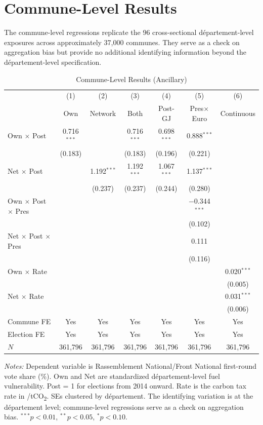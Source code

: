\documentclass[12pt]{article}
\providecommand{\euro}{\texteuro}
\newcommand{\rn}{Rassemblement National}
\newcommand{\fn}{Front National}
\newcommand{\dept}{d\'{e}partement}
\begin{document}
\section{Commune-Level Results}
\label{app:commune}

The commune-level regressions replicate the 96 cross-sectional \dept{}-level exposures across approximately 37,000 communes. They serve as a check on aggregation bias but provide no additional identifying information beyond the \dept{}-level specification.

\begin{table}[H]
\centering
\caption{Commune-Level Results (Ancillary)}
\label{tab:main}
\begin{threeparttable}
\begin{tabular}{@{}lcccccc@{}}
\toprule
 & (1) & (2) & (3) & (4) & (5) & (6) \\
 & Own & Network & Both & Post-GJ & Pres$\times$Euro & Continuous \\
\midrule
Own $\times$ Post & 0.716$^{***}$ & & 0.716$^{***}$ & 0.698$^{***}$ & 0.888$^{***}$ & \\
 & (0.183) & & (0.183) & (0.196) & (0.221) & \\[3pt]
Net $\times$ Post & & 1.192$^{***}$ & 1.192$^{***}$ & 1.067$^{***}$ & 1.137$^{***}$ & \\
 & & (0.237) & (0.237) & (0.244) & (0.280) & \\[3pt]
Own $\times$ Post $\times$ Pres & & & & & $-$0.344$^{***}$ & \\
 & & & & & (0.102) & \\[3pt]
Net $\times$ Post $\times$ Pres & & & & & 0.111 & \\
 & & & & & (0.116) & \\[3pt]
Own $\times$ Rate & & & & & & 0.020$^{***}$ \\
 & & & & & & (0.005) \\[3pt]
Net $\times$ Rate & & & & & & 0.031$^{***}$ \\
 & & & & & & (0.006) \\[3pt]
\midrule
Commune FE & Yes & Yes & Yes & Yes & Yes & Yes \\
Election FE & Yes & Yes & Yes & Yes & Yes & Yes \\
$N$ & 361,796 & 361,796 & 361,796 & 361,796 & 361,796 & 361,796 \\
\bottomrule
\end{tabular}
\begin{tablenotes}
\small
\item \textit{Notes:} Dependent variable is \rn{}/\fn{} first-round vote share (\%). Own and Net are standardized \dept{}-level fuel vulnerability. Post = 1 for elections from 2014 onward. Rate is the carbon tax rate in \euro/tCO\textsubscript{2}. SEs clustered by \dept{}. The identifying variation is at the \dept{} level; commune-level regressions serve as a check on aggregation bias. $^{***}p<0.01$, $^{**}p<0.05$, $^{*}p<0.10$.
\end{tablenotes}
\end{threeparttable}
\end{table}
\end{document}
